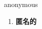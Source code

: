 
\begin{frame}
{\huge anonymous}
\begin{center}
\begin{enumerate}\Large
  \item \textbf{匿名的}
\end{enumerate}
\end{center}
\end{frame}
